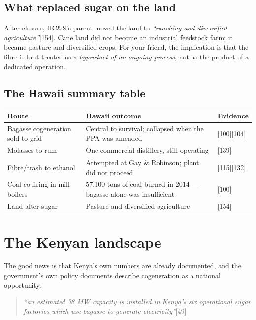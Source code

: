 \documentclass[11pt]{article}
\newcommand{\src}[1]{[#1]}
\begin{document}
\subsection{What replaced sugar on the land}

After closure, HC\&S's parent moved the land to \emph{``ranching and
diversified agriculture''}\src{154}. Cane land did not become an industrial
feedstock farm; it became pasture and diversified crops. For your friend, the
implication is that the fibre is best treated as a \emph{byproduct of an
ongoing process}, not as the product of a dedicated operation.

\subsection{The Hawaii summary table}

\begin{center}
\begin{tabular}{@{}p{}p{}p{}@{}}
\toprule
\textbf{Route} & \textbf{Hawaii outcome} & \textbf{Evidence} \\
\midrule
Bagasse cogeneration sold to grid &
Central to survival; collapsed when the PPA was amended &
\src{100}\src{104} \\
Molasses to rum &
One commercial distillery, still operating &
\src{139} \\
Fibre/trash to ethanol &
Attempted at Gay \& Robinson; plant did not proceed &
\src{115}\src{132} \\
Coal co-firing in mill boilers &
57{,}100 tons of coal burned in 2014 --- bagasse alone was insufficient &
\src{100} \\
Land after sugar &
Pasture and diversified agriculture &
\src{154} \\
\bottomrule
\end{tabular}
\end{center}

\section{The Kenyan landscape}

The good news is that Kenya's own numbers are already documented, and the
government's own policy documents describe cogeneration as a national
opportunity.

\begin{quote}
\emph{``an estimated 38 MW capacity is installed in Kenya's six operational
sugar factories which use bagasse to generate electricity''}\src{49}
\end{quote}
\end{document}
